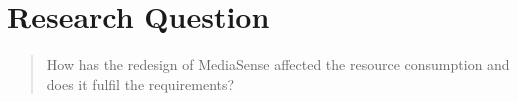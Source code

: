 \section{Research Question}
\begin{quotation}
How has the redesign of MediaSense affected the resource consumption and does it fulfil the requirements?
\end{quotation}

